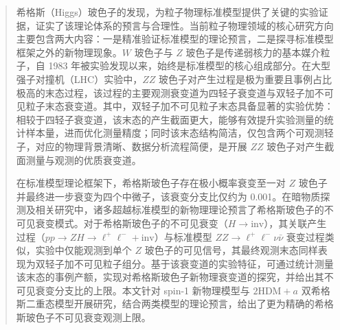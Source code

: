 

\begin{abstract}

希格斯（Higgs）玻色子的发现，为粒子物理标准模型提供了关键的实验证据，证实了该理论体系的预言与合理性。当前粒子物理领域的核心研究方向主要包含两大内容：一是精准验证标准模型的理论预言，二是探寻标准模型框架之外的新物理现象。$W$ 玻色子与 $Z$ 玻色子是传递弱核力的基本媒介粒子，自 1983 年被实验发现以来，始终是标准模型的核心组成部分。在大型强子对撞机（LHC）实验中，$ZZ$ 玻色子对产生过程是极为重要且事例占比极高的末态过程，该过程的主要观测衰变道为四轻子衰变道与双轻子加不可见粒子末态衰变道。其中，双轻子加不可见粒子末态具备显著的实验优势：相较于四轻子衰变道，该末态的产生截面更大，能够有效提升实验测量的统计样本量，进而优化测量精度；同时该末态结构简洁，仅包含两个可观测轻子，对应的物理背景清晰、数据分析流程简便，是开展 $ZZ$ 玻色子对产生截面测量与观测的优质衰变道。

在标准模型理论框架下，希格斯玻色子存在极小概率衰变至一对 $Z$ 玻色子并最终进一步衰变为四个中微子，该衰变分支比仅约为 0.001。在暗物质探测及相关研究中，诸多超越标准模型的新物理理论预言了希格斯玻色子的不可见衰变模式。对于希格斯玻色子的不可见衰变（$H\to\text{inv}$），其关联产生过程（$pp\rightarrow ZH \rightarrow \ell^+\ell^- + \text{inv}$）与标准模型 $ZZ\rightarrow \ell^+\ell^- \nu \bar\nu$ 衰变过程类似，实验中仅能观测到单个 $Z$ 玻色子的可见信号，其最终观测末态同样表现为双轻子加不可见粒子组分。基于该衰变道的实验特征，可通过统计测量该末态的事例产额，实现对希格斯玻色子新物理衰变道的探究，并给出其不可见衰变分支比的上限。本文针对 spin-1 新物理模型与 $\text{2HDM}+a$ 双希格斯二重态模型开展研究，结合两类模型的理论预言，给出了更为精确的希格斯玻色子不可见衰变观测上限。



\end{abstract}
